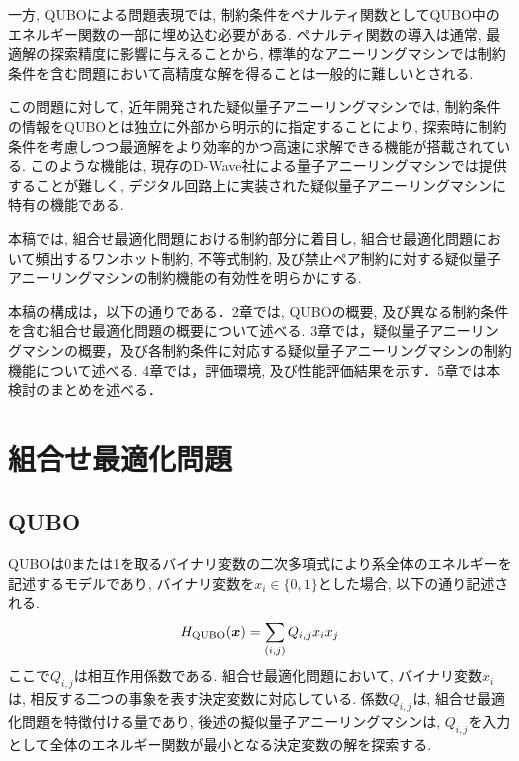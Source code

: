 \documentclass[submit,techrep,noauthor]{ipsj}
\begin{document}
一方, QUBOによる問題表現では, 制約条件をペナルティ関数としてQUBO中のエネルギー関数の一部に埋め込む必要がある. ペナルティ関数の導入は通常, 最適解の探索精度に影響に与えることから, 標準的なアニーリングマシンでは制約条件を含む問題において高精度な解を得ることは一般的に難しいとされる\cite{ozeki, onoda2}.

この問題に対して, 近年開発された疑似量子アニーリングマシンでは, 制約条件の情報をQUBOとは独立に外部から明示的に指定することにより, 探索時に制約条件を考慮しつつ最適解をより効率的かつ高速に求解できる機能が搭載されている\cite{takano, da3}. このような機能は, 現存のD-Wave社による量子アニーリングマシンでは提供することが難しく, デジタル回路上に実装された疑似量子アニーリングマシンに特有の機能である. 

本稿では, 組合せ最適化問題における制約部分に着目し, 組合せ最適化問題において頻出するワンホット制約, 不等式制約, 及び禁止ペア制約に対する疑似量子アニーリングマシンの制約機能の有効性を明らかにする.

本稿の構成は，以下の通りである．2章では, QUBOの概要, 及び異なる制約条件を含む組合せ最適化問題の概要について述べる. 3章では，疑似量子アニーリングマシンの概要，及び各制約条件に対応する疑似量子アニーリングマシンの制約機能について述べる. 4章では，評価環境, 及び性能評価結果を示す．5章では本検討のまとめを述べる．

\section{組合せ最適化問題}

\subsection{QUBO}
QUBOは0または1を取るバイナリ変数の二次多項式により系全体のエネルギーを記述するモデルであり, バイナリ変数を$x_{i}\in\{0, 1\}$とした場合, 以下の通り記述される.
\begin{equation}
H_{\rm{QUBO}}(\bm{x}) = \sum_{(i,j)} Q_{i,j}x_{i}x_{j}
\label{H_qubo}
\end{equation}
ここで$Q_{i,j}$は相互作用係数である. 組合せ最適化問題において, バイナリ変数$x_{i}$は, 相反する二つの事象を表す決定変数に対応している. 係数$Q_{i,j}$は, 組合せ最適化問題を特徴付ける量であり, 後述の擬似量子アニーリングマシンは, $Q_{i,j}$を入力として全体のエネルギー関数が最小となる決定変数の解を探索する. 
\end{document}
